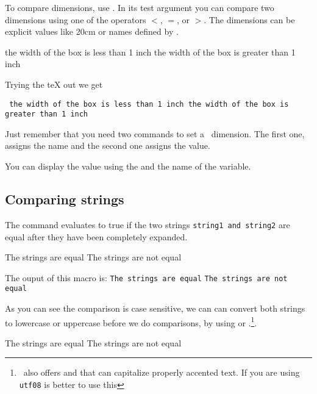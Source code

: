 \begin{teX}
\begin{teX}
\begin{teX}
To compare dimensions, use . In its test argument you
can compare two dimensions using one of the operators $<$, $=$, or
$>$. The dimensions can be explicit values like 20cm or names
defined by .

\begin{teX}
\newlength\boxwidth
\setlength{\boxwidth}{10cm}
\ifthenelse{\lengthtest{\boxwidth<2.54cm}}
  {the width of the box is less than 1 inch}  
  {the width of the box is greater than 1 inch}  
\end{teX}

Trying the  teX    out we get

{\tt
\newlength{\boxwidth}
\setlength{\boxwidth}{10cm}
\ifthenelse{\lengthtest{\boxwidth<1in}}
  {the width of the box is less than 1 inch}  
  {the width of the box is greater than 1 inch}  
\the\boxwidth
}

Just remember that you need two commands to set a \latex\ dimension. The first one,
 assigns the name and the second one  assigns the value.

You can display the value using the  and the name of the variable. 

\subsection{Comparing strings}
The  command evaluates to true if the two strings {\tt string1
and string2} are equal after they have been completely expanded.

\begin{teX}
\def\stringone{myname}
\def\stringtwo{Myname}
    {The strings are equal}
    {The strings are not equal}
\end{teX}

The ouput of this macro is: 
\def\stringone{myname}
\def\stringtwo{Myname}
\ifthenelse{\equal{\stringone}{\stringtwo}}
{\texttt{The strings are equal}}
{\texttt{The strings are not equal}}

As you can see the comparison is case sensitive, we can can convert both strings to
lowercase or uppercase before we do comparisons, by using  or .\footnote{\LaTeXe\ also offers  and  that can capitalize properly accented text. If you are using \texttt{utf08} is better to use this}.

\begin{teX}
\def\stringone{myname}
\def\stringtwo{myname}
\ifthenelse{\equal{\uppercase{\stringone}}{\uppercase{\stringtwo}}}
{The strings are equal}
{The strings are not equal}
\end{teX}


\end{teX}
\end{teX}
\end{teX}
